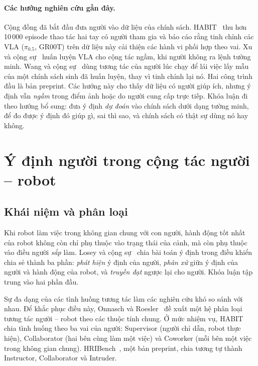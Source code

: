 \paragraph{Các hướng nghiên cứu gần đây.} Cộng đồng đã bắt đầu đưa người vào dữ liệu của chính sách. HABIT~\cite{song2026habit} thu hơn 10\,000 episode thao tác hai tay có người tham gia và báo cáo rằng tinh chỉnh các VLA ($\pi_{0.5}$, GR00T) trên dữ liệu này cải thiện các hành vi phối hợp theo vai. Xu và cộng sự~\cite{xu2026learning} huấn luyện VLA cho cộng tác ngầm, khi người không ra lệnh tường minh. Wang và cộng sự~\cite{wang2025steering} dùng tương tác của người lúc chạy để lái việc lấy mẫu của một chính sách sinh đã huấn luyện, thay vì tinh chỉnh lại nó. Hai công trình đầu là bản preprint. Các hướng này cho thấy dữ liệu có người giúp ích, nhưng ý định vẫn \emph{ngầm} trong điểm ảnh hoặc do người cung cấp trực tiếp. Khóa luận đi theo hướng bổ sung: đưa ý định \emph{dự đoán} vào chính sách dưới dạng tường minh, để đo được ý định đó giúp gì, sai thì sao, và chính sách có thật sự dùng nó hay không.

\section{Ý định người trong cộng tác người -- robot}
\label{sec:bg-intent}

\subsection{Khái niệm và phân loại}

Khi robot làm việc trong không gian chung với con người, hành động tốt nhất của robot không còn chỉ phụ thuộc vào trạng thái của cảnh, mà còn phụ thuộc vào điều người \emph{sắp} làm. Losey và cộng sự~\cite{losey2018review} chia bài toán ý định trong điều khiển chia sẻ thành ba phần: \emph{phát hiện} ý định của người, \emph{phân xử} giữa ý định của người và hành động của robot, và \emph{truyền đạt} ngược lại cho người. Khóa luận tập trung vào hai phần đầu.

Sự đa dạng của các tình huống tương tác làm các nghiên cứu khó so sánh với nhau. Để khắc phục điều này, Onnasch và Roesler~\cite{onnasch2021taxonomy} đề xuất một hệ phân loại tương tác người -- robot theo các thuộc tính chung. Ở mức nhiệm vụ, HABIT~\cite{song2026habit} chia tình huống theo ba vai của người: Supervisor (người chỉ dẫn, robot thực hiện), Collaborator (hai bên cùng làm một việc) và Coworker (mỗi bên một việc trong không gian chung). HRIBench~\cite{liu2026hribench}, một bản preprint, chia tương tự thành Instructor, Collaborator và Intruder.


